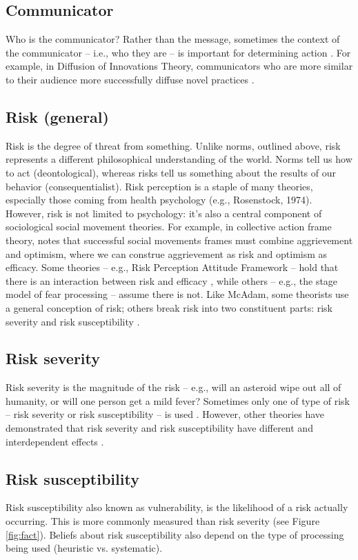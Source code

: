 \documentclass[12 pt]{article}
\begin{document}
		\subsection{Communicator}
		Who is the communicator? Rather than the message, sometimes the context of the communicator -- i.e., who they are -- is important for determining action \parencite{Chaiken1980}. For example, in Diffusion of Innovations Theory, communicators who are more similar to their audience more successfully diffuse novel practices \parencite{Rogers2010}. 
		\subsection{Risk (general)}
		Risk is the degree of threat from something. Unlike norms, outlined above, risk represents a different philosophical understanding of the world. Norms tell us how to act (deontological), whereas risks tell us something about the results of our behavior (consequentialist). Risk perception is a staple of many theories, especially those coming from health psychology (e.g., Rosenstock, 1974). However, risk is not limited to psychology: it's also a central component of sociological social movement theories. For example,  in collective action frame theory,  \textcite{McAdam1996} notes that successful social movements frames must combine aggrievement and optimism, where we can construe aggrievement as risk and optimism as efficacy. Some theories -- e.g., Risk Perception Attitude Framework -- hold that there is an interaction between risk and efficacy \parencite{Rimal2001}, while others -- e.g., the stage model of fear processing \parencite{DeHoog2007} -- assume there is not. Like McAdam, some theorists use a general conception of risk; others break risk into two constituent parts: risk severity and risk susceptibility \parencite{Maloney2011}. 
		\subsection{Risk severity}
		Risk severity is the magnitude of the risk -- e.g., will an asteroid wipe out all of humanity, or will one person get a mild fever? Sometimes only one of type of risk -- risk severity or risk susceptibility -- is used \parencite[e.g.,][]{Rimal2001}. However, other theories have demonstrated that risk severity and risk susceptibility have different and interdependent effects \parencite{DeHoog2007}.
		\subsection{Risk susceptibility}
		Risk susceptibility also known as vulnerability, is the likelihood of a risk actually occurring. This is more commonly measured than risk severity (see Figure \ref{fig:fact}). Beliefs about risk susceptibility also depend on the type of processing being used (heuristic vs. systematic). 
\end{document}
